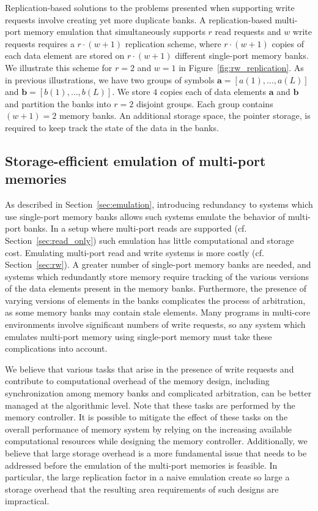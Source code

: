 Replication-based solutions to the problems presented when supporting write requests involve creating yet more duplicate banks. A replication-based multi-port memory emulation that simultaneously supports $r$ read requests and $w$ write requests requires a $r\cdot(w + 1)$ replication scheme, where $r\cdot(w+1)$ copies of each data element are stored on $r\cdot(w + 1)$ different single-port memory banks. We illustrate this scheme for $r = 2$ and $w = 1$ in Figure~\ref{fig:rw_replication}. As in previous illustrations, we have two groups of symbols $\mathbf{a} = [a(1),\ldots, a(L)]$ and $\mathbf{b}  = [b(1),\ldots, b(L)]$. We store $4$ copies each of data elements $\mathbf{a}$ and $\mathbf{b}$ and partition the banks into $r = 2$ disjoint groups. Each group contains $(w + 1) = 2$ memory banks. An additional storage space, the pointer storage, is required to keep track the state of the data in the banks.


\subsection{Storage-efficient emulation of multi-port memories}
\label{sec:efficient_emulation}

As described in Section~\ref{sec:emulation}, introducing redundancy to systems which use single-port memory banks allows such systems emulate the behavior of multi-port banks. In a setup where multi-port reads are supported (cf. Section~\ref{sec:read_only}) such emulation has little computational and storage cost. Emulating multi-port read and write systems is more costly (cf. Section~\ref{sec:rw}). A greater number of single-port memory banks are needed, and systems which redundantly store memory require tracking of the various versions of the data elements present in the memory banks. Furthermore, the presence of varying versions of elements in the banks complicates the process of arbitration, as some memory banks may contain stale elements. Many programs in multi-core environments involve significant numbers of write requests, so any system which emulates multi-port memory using single-port memory must take these complications into account.

We believe that various tasks that arise in the presence of write requests and contribute to computational overhead of the memory design, including synchronization among memory banks and complicated arbitration, can be better managed at the algorithmic level. Note that these tasks are performed by the memory controller. It is possible to mitigate the effect of these tasks on the overall performance of memory system by relying on the increasing available computational resources while designing the memory controller. Additionally, we believe that large storage overhead is a more fundamental issue that needs to be addressed before the emulation of the multi-port memories is feasible. In particular, the large replication factor in a naive emulation create so large a storage overhead that the resulting area requirements of such designs are impractical.


